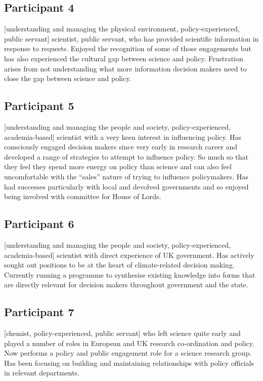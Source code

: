 \subsection{Participant 4}\label{sec:p4}
[understanding and managing the physical environment, policy-experienced, public servant] scientist, public servant, who has provided scientific information in response to requests. Enjoyed the recognition of some of those engagements but has also experienced the cultural gap between science and policy. Frustration arises from not understanding what more information decision makers need to close the gap between science and policy.

\subsection{Participant 5}\label{sec:p5}
[understanding and managing the people and society, policy-experienced, academia-based] scientist with a very keen interest in influencing policy. Has consciously engaged decision makers since very early in research career and developed a range of strategies to attempt to influence policy. So much so that they feel they spend more energy on policy than science and can also feel uncomfortable with the ``sales'' nature of trying to influence policymakers. Has had successes particularly with local and devolved governments and so enjoyed being involved with committee for House of Lords.

\subsection{Participant 6}\label{sec:p6}
[understanding and managing the people and society, policy-experienced, academia-based] scientist with direct experience of UK government. Has actively sought out positions to be at the heart of climate-related decision making. Currently running a programme to synthesise existing knowledge into forms that are directly relevant for decision makers throughout government and the state.

\subsection{Participant 7}\label{sec:p7}
[chemist, policy-experienced, public servant] who left science quite early and played a number of roles in European and UK research co-ordination and policy. Now performs a policy and public engagement role for a science research group. Has been focusing on building and maintaining relationships with policy officials in relevant departments.

